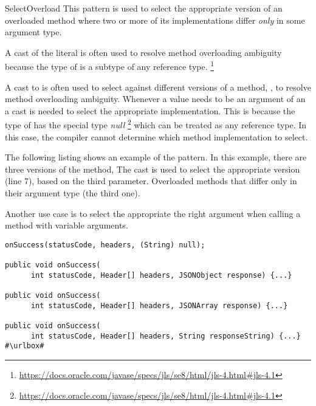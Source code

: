 \begin{pattern}{SelectOverload}
This pattern is used to select the appropriate version of an overloaded method%
where two or more of its implementations differ \emph{only} in some argument type.

A cast of the   literal is often used to 
  resolve method overloading ambiguity because the type of  
  is a subtype of any reference type.%
\footnote{\url{https://docs.oracle.com/javase/specs/jls/se8/html/jls-4.html\#jls-4.1}}


A cast to  is often used to select against different versions
of a method, \ie{}, to resolve method overloading ambiguity.
Whenever a  value needs to be an argument of an a cast is
needed to select the appropriate implementation.
This is because the type of  has the special type \emph{null}%
\footnote{\url{https://docs.oracle.com/javase/specs/jls/se8/html/jls-4.html\#jls-4.1}}
which can be treated as any reference type.
In this case,
the compiler cannot determine which method implementation to select.


\instances{}
The following listing%
\def\urlvar{http://bit.ly/loopj_android_async_http_2FENovD}
shows an example of the \thisp{} pattern.
In this example, there are three versions of the  method,
The cast  is used to select the appropriate version
(line 7), based on the third parameter.
Overloaded methods that differ only in their argument type (the third one).

Another use case is to select the appropriate the right argument when
calling a method with variable arguments.

\begin{verbatim}
onSuccess(statusCode, headers, (String) null);

public void onSuccess(
      int statusCode, Header[] headers, JSONObject response) {...}

public void onSuccess(
      int statusCode, Header[] headers, JSONArray response) {...}

public void onSuccess(
      int statusCode, Header[] headers, String responseString) {...}
#\urlbox#
\end{verbatim}


\end{pattern}
